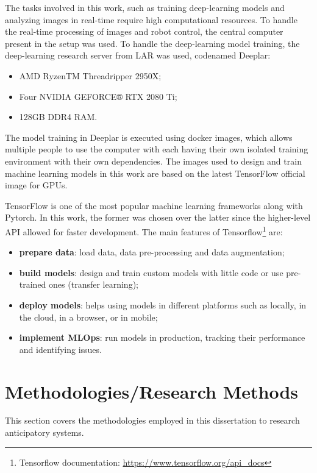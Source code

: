 The tasks involved in this work, such as training deep-learning models and analyzing images in real-time require high computational resources. To handle the real-time processing of images and robot control, the central computer present in the setup was used. To handle the deep-learning model training, the deep-learning research server from LAR was used, codenamed Deeplar:
\begin{itemize}
    \item AMD RyzenTM Threadripper 2950X;
    \item Four NVIDIA GEFORCE® RTX 2080 Ti;
    \item 128GB DDR4 RAM.
\end{itemize}

The model training in Deeplar is executed using docker images, which allows multiple people to use the computer with each having their own isolated training environment with their own dependencies. The images used to design and train machine learning models in this work are based on the latest TensorFlow official image for GPUs.

TensorFlow is one of the most popular machine learning frameworks along with Pytorch. In this work, the former was chosen over the latter since the higher-level API allowed for faster development. The main features of Tensorflow\footnote{Tensorflow documentation: \url{https://www.tensorflow.org/api_docs}} are:
\begin{itemize}
    \item \textbf{prepare data}: load data, data pre-processing and data augmentation;
    \item \textbf{build models}: design and train custom models with little code or use pre-trained ones (transfer learning);
    \item \textbf{deploy models}: helps using models in different platforms such as locally, in the cloud, in a browser, or in mobile;
    \item \textbf{implement MLOps}: run models in production, tracking their performance and identifying issues.
\end{itemize}

\section{Methodologies/Research Methods}
\label{section:methodologies}

This section covers the methodologies employed in this dissertation to research anticipatory systems.

